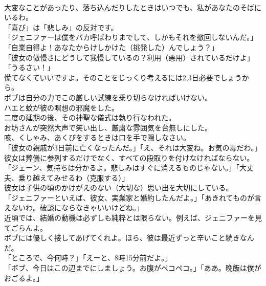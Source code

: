 \documentclass[8pt]{extreport}
\begin{document}
\begin{CJK}{UTF8}{min}
\\	大変なことがあったり、落ち込んだりしたときはいつでも、私があなたのそばにいるわ。
\\	「喜び」は「悲しみ」の反対です。
\\	「ジェニファーは僕をバカ呼ばわりまでして、しかもそれを撤回しないんだ。」「自業自得よ！あなたからけしかけた（挑発した）んでしょう？」
\\	「彼女の傲慢さにどうして我慢しているの？利用（悪用）されているだけよ」「うるさい！」
\\	慌てなくていいですよ。そのことをじっくり考えるには2,3日必要でしょうから。
\\	ボブは自分の力でこの厳しい試練を乗り切らなければいけない。
\\	ハエと蚊が彼の瞑想の邪魔をした。
\\	二度の延期の後、その神聖な儀式は執り行なわれた。
\\	お坊さんが突然大声で笑い出し、厳粛な雰囲気を台無しにした。
\\	咳、くしゃみ、あくびをするときは口を手で隠しなさい。
\\	「彼女の親戚が3日前に亡くなったんだ。」「え、それは大変ね。お気の毒だわ。」
\\	彼女は葬儀に参列するだけでなく、すべての段取りを付けなければならない。
\\	「ジェーン、気持ちは分かるよ。悲しみはすぐに消えるものじゃない。」「大丈夫、乗り越えてみせるわ（克服する）」
\\	彼女は子供の頃のかけがえのない（大切な）思い出を大切にしている。
\\	「ジェニファーといえば、彼女、実業家と婚約したんだよ。」「あきれてものが言えないわ。破談にならなきゃいいけどね。」
\\	近頃では、結婚の動機は必ずしも純粋とは限らない。例えば、ジェニファーを見てごらんよ。
\\	ボブには優しく接してあげてくれよ。ほら、彼は最近ずっと辛いこと続きなんだ。
\\	「ところで、今何時？」「えーと、8時15分前だよ。」
\\	「ボブ、今日はこの辺までにしましょう。お腹がペコペコ。」「ああ。晩飯は僕がおごるよ。」
\end{CJK}
\end{document}
